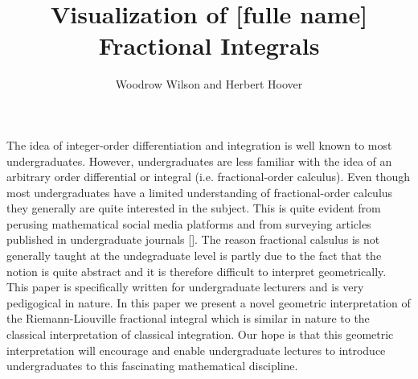 \documentclass{article}
\theoremstyle{theorem}
\theoremstyle{definition}
\begin{document}
\title{Visualization of [fulle name] Fractional Integrals}
\author{Woodrow Wilson and Herbert Hoover} %

\maketitle




The idea of integer-order differentiation and integration is well known to most undergraduates. However, undergraduates are less familiar with the idea of an arbitrary order differential or integral (i.e. fractional-order calculus).
Even though most undergraduates have a limited understanding of fractional-order calculus they generally are quite interested in the subject. This is quite 
evident from perusing mathematical social media platforms and from surveying articles published in undergraduate journals []. The reason fractional calsulus is not generally 
taught at the undegraduate level is partly due to the fact that the notion is quite abstract and it is therefore difficult to interpret geometrically. This paper 
is specifically written for undergraduate lecturers and is very pedigogical in nature. In this paper we present a novel geometric interpretation of the 
Riemann-Liouville fractional integral which is similar in nature to the classical interpretation of classical integration. Our hope is that this 
geometric interpretation will encourage and enable undergraduate lectures to introduce undergraduates to this fascinating mathematical discipline.  
\end{document}
